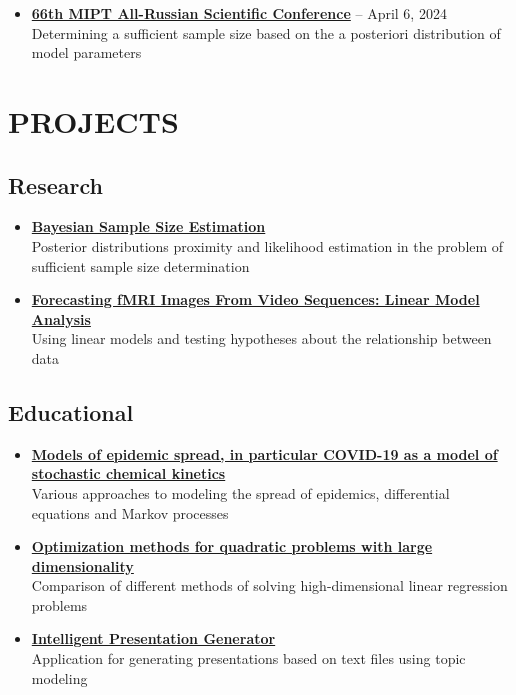\documentclass[12pt]{moderncv}
\begin{document}
        \begin{itemize}
            \item \href{https://www.youtube.com/live/WnIRaRl730A?si=q0eScgnDP2ZidCpK&t=1723}{\textbf{66th MIPT All-Russian Scientific Conference}} -- April 6, 2024\\
            Determining a sufficient sample size based on the a posteriori distribution of model parameters
        \end{itemize}

    \section{PROJECTS}

        \subsection{Research}

        \begin{itemize}
            \item \href{https://github.com/kisnikser/Bayesian-Sample-Size-Estimation}{\textbf{Bayesian Sample Size Estimation}}\\
            Posterior distributions proximity and likelihood estimation in the problem of
            sufficient sample size determination
            \item \href{https://github.com/intsystems/2023-Project-112}{\textbf{Forecasting fMRI Images From Video Sequences: Linear Model Analysis}}\\
            Using linear models and testing hypotheses about the relationship between data
        \end{itemize}

        \subsection{Educational}

        \begin{itemize}
            \item \href{https://github.com/kisnikser/Epidemic-Spread-Models}{\textbf{Models of epidemic spread, in particular COVID-19 as a model of stochastic chemical kinetics}}\\
            Various approaches to modeling the spread of epidemics, differential equations and Markov processes
            \item \href{https://github.com/kisnikser/Optimization-Methods}{\textbf{Optimization methods for quadratic problems with large dimensionality}}\\
            Comparison of different methods of solving high-dimensional linear regression problems
            \item \href{https://github.com/kisnikser/Intelligent-Presentation-Generator}{\textbf{Intelligent Presentation Generator}}\\
            Application for generating presentations based on text files using topic modeling
        \end{itemize}
\end{document}

